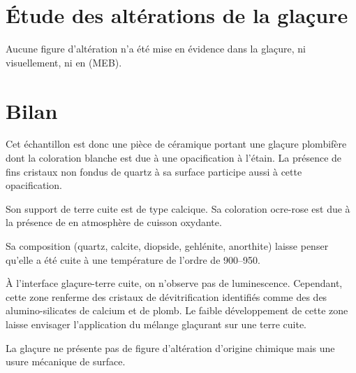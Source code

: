 \section{Étude des altérations de la glaçure}

Aucune figure d'altération n'a été mise en évidence dans la glaçure, 
ni visuellement, ni en \MEB[ie] (MEB).


\section{Bilan}

Cet échantillon est donc une pièce de céramique portant une glaçure 
plombifère dont la coloration blanche est due à une opacification à 
l'étain. La présence de fins cristaux non fondus de quartz à sa 
surface participe aussi à cette opacification.

Son support de terre cuite est de type calcique. Sa coloration 
ocre-rose est due à la présence de  en atmosphère de 
cuisson oxydante.

Sa composition \cristallo (quartz, calcite, diopside, gehlénite, anorthite) laisse penser qu'elle a été cuite à une température de l'ordre de \SIrange[range-phrase=\ à\ ]{900}{950}{\degC}.

À l'interface glaçure-terre cuite, on n'observe pas de luminescence. 
Cependant, cette zone renferme des cristaux de dévitrification 
identifiés comme des des alumino-silicates de calcium et de plomb. 
Le faible développement de cette zone laisse envisager l'application 
du mélange glaçurant sur une terre cuite.

La glaçure ne présente pas de figure d'altération d'origine chimique 
mais une usure mécanique de surface.
